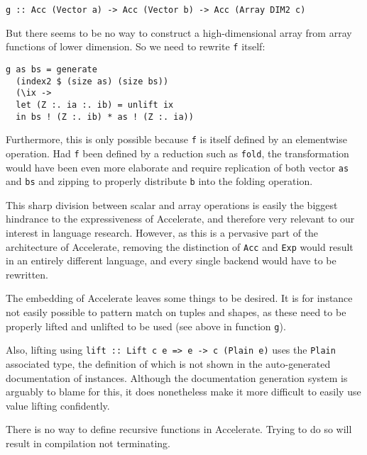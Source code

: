 \begin{verbatim}
g :: Acc (Vector a) -> Acc (Vector b) -> Acc (Array DIM2 c)
\end{verbatim}

But there seems to be no way to construct a high-dimensional array from array
functions of lower dimension. So we need to rewrite \texttt{f} itself:

\begin{verbatim}
g as bs = generate
  (index2 $ (size as) (size bs))
  (\ix ->
  let (Z :. ia :. ib) = unlift ix
  in bs ! (Z :. ib) * as ! (Z :. ia))
\end{verbatim}

Furthermore, this is only possible because \texttt{f} is itself defined by an
elementwise operation. Had \texttt{f} been defined by a reduction such as
\texttt{fold}, the transformation would have been even more elaborate and
require replication of both vector \texttt{as} and \texttt{bs} and zipping to
properly distribute \texttt{b} into the folding operation.


This sharp division between scalar and array operations is easily the biggest
hindrance to the expressiveness of Accelerate, and therefore very relevant to
our interest in language research. However, as this is a pervasive part of the
architecture of Accelerate, removing the distinction of \texttt{Acc} and
\texttt{Exp} would result in an entirely different language, and every single
backend would have to be rewritten.

The embedding of Accelerate leaves some things to be desired. It is for
instance not easily possible to pattern match on tuples and shapes, as these
need to be properly lifted and unlifted to be used (see above in function \texttt{g}).

Also, lifting using \texttt{lift :: Lift c e => e -> c (Plain e)} uses the
\texttt{Plain} associated type, the definition of which is not shown in the
auto-generated documentation of instances. Although the documentation
generation system is arguably to blame for this, it does nonetheless make it
more difficult to easily use value lifting confidently.

There is no way to define recursive functions in Accelerate. Trying to do so
will result in compilation not terminating.

